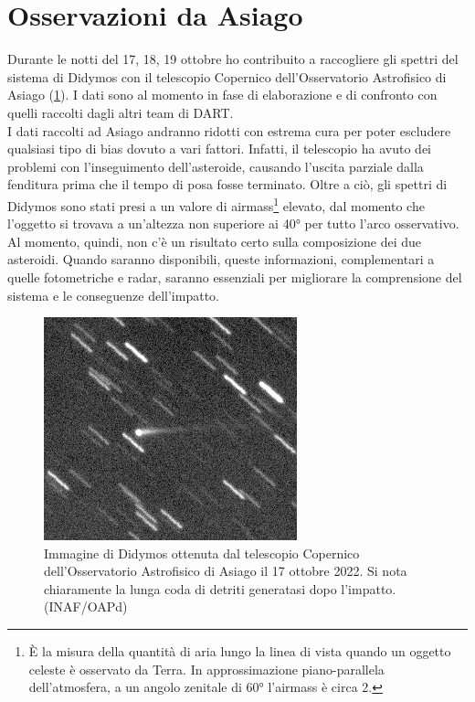 \documentclass[a4paper,11pt,openright]{book}
\begin{document}
\section{Osservazioni da Asiago}
Durante le notti del 17, 18, 19 ottobre ho contribuito a raccogliere gli spettri del sistema di Didymos con il telescopio Copernico dell'Osservatorio Astrofisico di Asiago (\cref{fig:didymos_asiago}). I dati sono al momento in fase di elaborazione e di confronto con quelli raccolti dagli altri team di DART.\\
I dati raccolti ad Asiago andranno ridotti con estrema cura per poter escludere qualsiasi tipo di bias dovuto a vari fattori. Infatti, il telescopio ha avuto dei problemi con l'inseguimento dell'asteroide, causando l'uscita parziale dalla fenditura prima che il tempo di posa fosse terminato. Oltre a ciò, gli spettri di Didymos sono stati presi a un valore di airmass\footnote{È la misura della quantità di aria lungo la linea di vista quando un oggetto celeste è osservato da Terra. In approssimazione piano-parallela dell'atmosfera, a un angolo zenitale di 60° l'airmass è circa 2.} elevato, dal momento che l'oggetto si trovava a un'altezza non superiore ai 40° per tutto l'arco osservativo.\\
Al momento, quindi, non c'è un risultato certo sulla composizione dei due asteroidi. Quando saranno disponibili, queste informazioni, complementari a quelle fotometriche e radar, saranno essenziali per migliorare la comprensione del sistema e le conseguenze dell'impatto.

\begin{figure}
    \centering
    \includegraphics[scale=1]{figure/didymos_asiago.jpg}
    \caption[Immagine di Didymos ottenuta con il telescopio Copernico dell'OAPd.]{Immagine di Didymos ottenuta dal telescopio Copernico dell'Osservatorio Astrofisico di Asiago il 17 ottobre 2022. Si nota chiaramente la lunga coda di detriti generatasi dopo l'impatto. (INAF/OAPd)}
    \label{fig:didymos_asiago}
\end{figure}
\end{document}
